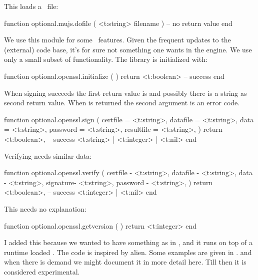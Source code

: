 This loads a \JAVASCRIPT\ file:

\starttyping[option=LUA]
function optional.mujs.dofile ( <t:string> filename )
    -- no return value
end
\stoptyping

\stopsubsubsubject

\startsubsubsubject[title=openssl]

We use this module for some \PDF\ features. Given the frequent updates to the
(external) code base, it's for sure not something one wants in the engine. We use
only a small subset of functionality. The library is initialized with:

\starttyping[option=LUA]
function optional.openssl.initialize ( )
    return <t:boolean> -- success
end
\stoptyping

When signing succeeds the first return value is  and possibly there
is a string as second return value. When  is returned the second
argument is an error code.

\starttyping[option=LUA]
function optional.openssl.sign (
    {
        certfile   = <t:string>,
        datafile   = <t:string>,
        data       = <t:string>,
        password   = <t:string>,
        resultfile = <t:string>,
    }
)
    return
        <t:boolean>, -- success
        <t:string> | <t:integer> | <t:nil>
end
\stoptyping

Verifying needs similar data:

\starttyping[option=LUA]
function optional.openssl.verify (
    {
        certfile - <t:string>,
        datafile - <t:string>,
        data     - <t:string>,
        signature- <t:string>,
        password - <t:string>,
    }
)
    return
        <t:boolean>, -- success
        <t:integer> | <t:nil>
end
\stoptyping

This needs no explanation:

\starttyping[option=LUA]
function optional.openssl.getversion ( )
    return <t:integer>
end
\stoptyping

\stopsubsubsubject

\stopsubsection

\startsubsection[title=Foreign]

I added this because we wanted to have something  as in \LUATEX, and
it runs on top of a runtime loaded . The code is inspired by \quote
{alien}. Some examples are given in . and when there
is demand we might document it in more detail here. Till then it is considered
experimental.

